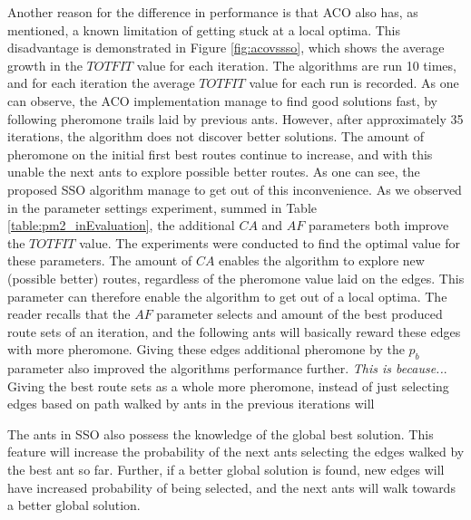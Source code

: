 Another reason for the difference in performance is that ACO also has, as mentioned, a known limitation of getting stuck at a local optima. This disadvantage is demonstrated in Figure \ref{fig:acovssso}, which shows the average growth in the $TOTFIT$ value for each iteration. The algorithms are run 10 times, and for each iteration the average $TOTFIT$ value for each run is recorded. As one can observe, the ACO implementation manage to find good solutions fast, by following pheromone trails laid by previous ants. However, after approximately 35 iterations, the algorithm does not discover better solutions. The amount of pheromone on the initial first best routes continue to increase, and with this unable the next ants to explore possible better routes. As one can see, the proposed SSO algorithm manage to get out of this inconvenience. As we observed in the parameter settings experiment, summed in Table \vref{table:pm2_inEvaluation}, the additional $CA$ and $AF$ parameters both improve the $TOTFIT$ value. The experiments were conducted to find the optimal value for these parameters. %
The amount of $CA$ enables the algorithm to explore new (possible better) routes, regardless of the pheromone value laid on the edges. This parameter can therefore enable the algorithm to get out of a local optima. The reader recalls that the $AF$ parameter selects and amount of the best produced route sets of an iteration, and the following ants will basically reward these edges with more pheromone. Giving these edges additional pheromone by the $p_b$ parameter also improved the algorithms performance further. \emph{\color{blue}This is because..}. Giving the best route sets as a whole more pheromone, instead of just selecting edges based on path walked by ants in the previous iterations will 

The ants in SSO also possess the knowledge of the global best solution. This feature will increase the probability of the next ants selecting the edges walked by the best ant so far. Further, if a better global solution is found, new edges will have increased probability of being selected, and the next ants will walk towards a better global solution.

